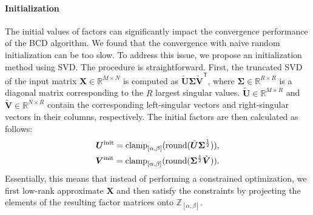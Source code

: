 

\paragraph*{Initialization}
The initial values of factors can significantly impact the convergence performance of the BCD algorithm. We found that the convergence with naive random initialization can be too slow. To address this issue, we propose an initialization method using SVD. The procedure is straightforward. First, the truncated SVD of the input matrix $\bm{X} \in \mathbb{R}^{M \times N}$ is computed as $\tilde{\bm{U}} \bm{\Sigma} \tilde{\bm{V}}^\mathsf{T}$, where $\bm{\Sigma} \in \mathbb{R}^{R \times R}$ is a diagonal matrix corresponding to the $R$ largest singular values. $\tilde{\bm{U}} \in \mathbb{R}^{M \times R}$ and $\tilde{\bm{V}} \in \mathbb{R}^{N \times R}$ contain the corresponding left-singular vectors and right-singular vectors in their columns, respectively. The initial factors are then calculated as follows:
\begin{align}
    \bm{U}^{\rm init} = \operatorname{clamp}_{[\alpha,\beta]}(\operatorname{round}(\tilde{\bm{U}} \bm{\Sigma}^\frac{1}{2})), \label{eq:initialization_u} \\
    \bm{V}^{\rm init} = \operatorname{clamp}_{[\alpha,\beta]}(\operatorname{round}(\bm{\Sigma}^\frac{1}{2} \tilde{\bm{V}})). \label{eq:initialization_v}
\end{align}
Essentially, this means that instead of performing a constrained optimization, we first low-rank approximate $\bm{X}$ and then satisfy the constraints by projecting the elements of the resulting factor matrices onto $\mathbb{Z}_{[\alpha,\beta]}$.

